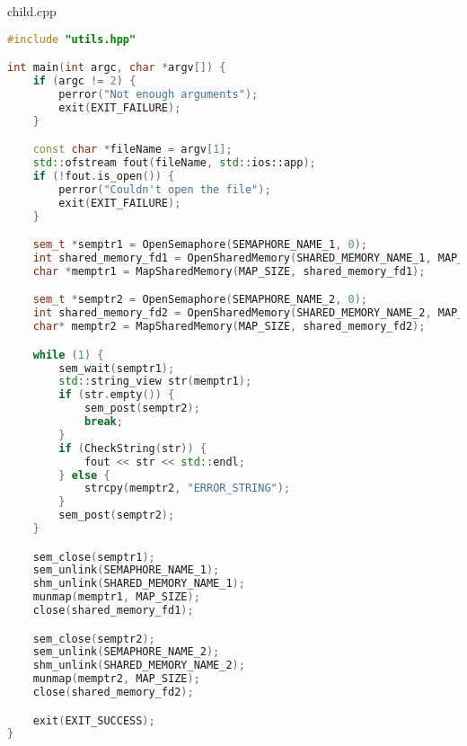 \documentclass[a4paper, 12pt]{article}
\begin{document}
child.cpp
\begin{lstlisting}[language=C++]
#include "utils.hpp"

int main(int argc, char *argv[]) {
    if (argc != 2) {
        perror("Not enough arguments");
        exit(EXIT_FAILURE);
    }

    const char *fileName = argv[1];
    std::ofstream fout(fileName, std::ios::app);
    if (!fout.is_open()) {
        perror("Couldn't open the file");
        exit(EXIT_FAILURE);
    }

    sem_t *semptr1 = OpenSemaphore(SEMAPHORE_NAME_1, 0);
    int shared_memory_fd1 = OpenSharedMemory(SHARED_MEMORY_NAME_1, MAP_SIZE);
    char *memptr1 = MapSharedMemory(MAP_SIZE, shared_memory_fd1);

    sem_t *semptr2 = OpenSemaphore(SEMAPHORE_NAME_2, 0);
    int shared_memory_fd2 = OpenSharedMemory(SHARED_MEMORY_NAME_2, MAP_SIZE);
    char* memptr2 = MapSharedMemory(MAP_SIZE, shared_memory_fd2);

    while (1) {
        sem_wait(semptr1);
        std::string_view str(memptr1);
        if (str.empty()) {
            sem_post(semptr2);
            break;
        }
        if (CheckString(str)) {
            fout << str << std::endl;
        } else {
            strcpy(memptr2, "ERROR_STRING");
        }
        sem_post(semptr2);
    }

    sem_close(semptr1);
    sem_unlink(SEMAPHORE_NAME_1);
    shm_unlink(SHARED_MEMORY_NAME_1);
    munmap(memptr1, MAP_SIZE);
    close(shared_memory_fd1);

    sem_close(semptr2);
    sem_unlink(SEMAPHORE_NAME_2);
    shm_unlink(SHARED_MEMORY_NAME_2);
    munmap(memptr2, MAP_SIZE);
    close(shared_memory_fd2);

    exit(EXIT_SUCCESS);  
}

\end{lstlisting}
\end{document}
